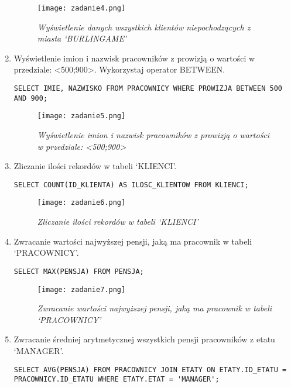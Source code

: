 \documentclass[a4paper, 10pt]{article}
\begin{document}
\begin{enumerate}
\begin{figure}[H]
	\centering
	\texttt{[image: zadanie4.png]}
	\caption{\textit{Wyświetlenie danych wszystkich klientów niepochodzących z miasta `BURLINGAME'}}
\end{figure}


\item Wyświetlenie imion i nazwisk pracowników z prowizją o wartości w przedziale: <500;900>. Wykorzystaj operator BETWEEN. 
\begin{lstlisting}[style=SQL, caption=\textit{Wyświetlenie imion i nazwisk pracowników z prowizją o wartości w przedziale: <500;900>}]
SELECT IMIE, NAZWISKO FROM PRACOWNICY WHERE PROWIZJA BETWEEN 500 AND 900;
\end{lstlisting}

\begin{figure}[H]
	\centering
	\texttt{[image: zadanie5.png]}
	\caption{\textit{Wyświetlenie imion i nazwisk pracowników z prowizją o wartości w przedziale: <500;900>}}
\end{figure}


\item Zliczanie ilości rekordów w tabeli `KLIENCI'. 
\begin{lstlisting}[style=SQL, caption=\textit{Zliczanie ilości rekordów w tabeli `KLIENCI'}]
SELECT COUNT(ID_KLIENTA) AS ILOSC_KLIENTOW FROM KLIENCI;
\end{lstlisting}

\begin{figure}[H]
	\centering
	\texttt{[image: zadanie6.png]}
	\caption{\textit{Zliczanie ilości rekordów w tabeli `KLIENCI'}}
\end{figure}


\item Zwracanie wartości najwyższej pensji, jaką ma pracownik w tabeli `PRACOWNICY'.  
\begin{lstlisting}[style=SQL, caption=\textit{Zwracanie wartości najwyższej pensji, jaką ma pracownik w tabeli `PRACOWNICY'}]
SELECT MAX(PENSJA) FROM PENSJA;
\end{lstlisting}

\begin{figure}[H]
	\centering
	\texttt{[image: zadanie7.png]}
	\caption{\textit{Zwracanie wartości najwyższej pensji, jaką ma pracownik w tabeli `PRACOWNICY'}}
\end{figure}


\item Zwracanie średniej arytmetycznej wszystkich pensji pracowników z etatu `MANAGER'.  
\begin{lstlisting}[style=SQL, caption=\textit{Zwracanie średniej arytmetycznej wszystkich pensji pracowników z etatu `MANAGER'}]
SELECT AVG(PENSJA) FROM PRACOWNICY JOIN ETATY ON ETATY.ID_ETATU = PRACOWNICY.ID_ETATU WHERE ETATY.ETAT = 'MANAGER';
\end{lstlisting}


\end{enumerate}
\end{document}
